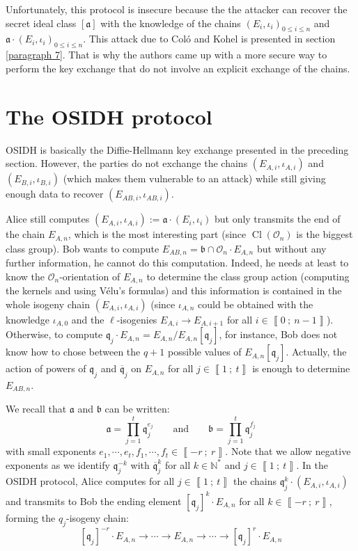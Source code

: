 \documentclass[a4paper,10pt]{report}
\theoremstyle{definition}
\theoremstyle{plain}
\theoremstyle{definition}
\newcommand{\N}{\mathbb{N}}
\newcommand{\mO}{\mathcal{O}}
\renewcommand{\i}[2]{\left\llbracket #1~;~#2\right\rrbracket}
\renewcommand{\(}{\left(}
\renewcommand{\)}{\right)}
\newcommand{\mf}[1]{\mathfrak{#1}}
\newcommand{\mfq}{\mathfrak{q}}
\DeclareMathOperator{\Cl}{Cl}
\begin{document}
Unfortunately, this protocol is insecure because the the attacker can recover the secret ideal class $[\mf{a}]$ with the knowledge of the chains $(E_i,\iota_i)_{0\leq i\leq n}$ and $\mf{a}\cdot(E_i,\iota_i)_{0\leq i\leq n}$.  This attack due to Col\'{o} and Kohel \cite[§ 5.1]{OSIDH} is presented in section \ref{paragraph 7}.  That is why the authors came up with a more secure way to perform the key exchange that do not involve an explicit exchange of the chains.

\section{The OSIDH protocol}\label{paragraph 8}

OSIDH is basically the Diffie-Hellmann key exchange presented in the preceding section. However,  the parties do not exchange the chains $(E_{A,i},\iota_{A,i})$ and $(E_{B,i},\iota_{B,i})$ (which makes them vulnerable to an attack) while still giving enough data to recover $(E_{AB,i},\iota_{AB,i})$.  

Alice still computes $(E_{A,i},\iota_{A,i}):=\mf{a}\cdot (E_i,\iota_i)$ but only transmits the end of the chain $E_{A,n}$, which is the most interesting part (since $\Cl(\mO_n)$ is the biggest class group).  Bob wants to compute $E_{AB,n}=\mf{b}\cap\mO_n\cdot E_{A,n}$ but without any further information, he cannot do this computation. Indeed, he needs at least to know the $\mO_n$-orientation of $E_{A,n}$ to determine the class group action (computing the kernels and using V\'{e}lu's formulas) and this information is contained in the whole isogeny chain $(E_{A,i},\iota_{A,i})$ (since $\iota_{A,n}$ could be obtained with the knowledge $\iota_{A,0}$ and the $\ell$-isogenies $E_{A,i}\longrightarrow E_{A,i+1}$ for all $i\in\i{0}{n-1}$). Otherwise, to compute $\mfq_j\cdot E_{A,n}=E_{A,n}/E_{A,n}[\mfq_j]$, for instance, Bob does not know how to chose between the $q+1$ possible values of $E_{A,n}[\mfq_j]$.  Actually, the action of powers of $\mfq_j$ and $\overline{\mfq}_j$ on $E_{A,n}$ for all $j\in\i{1}{t}$ is enough to determine $E_{AB,n}$.

We recall that $\mf{a}$ and $\mf{b}$ can be written:
\[\mf{a}=\prod_{j=1}^t \mf{q}_j^{e_j} \qquad \mbox{and} \qquad \mf{b}=\prod_{j=1}^t \mf{q}_j^{f_j}\]
with small exponents $e_1,\cdots,e_t, f_1,\cdots,f_t\in\i{-r}{r}$.  Note that we allow negative exponents as we identify $\mf{q}_j^{-k}$ with $\overline{\mf{q}}_j^{k}$ for all $k\in\N^*$ and $j\in\i{1}{t}$.  In the OSIDH protocol, Alice computes for all $j\in\i{1}{t}$ the chains $\mfq_j^k\cdot (E_{A,i},\iota_{A,i})$ and transmits to Bob the ending element $[\mfq_j]^k\cdot E_{A,n}$ for all $k\in\i{-r}{r}$, forming the $q_j$-isogeny chain:
\[[\mfq_j]^{-r}\cdot E_{A,n}\longrightarrow \cdots \longrightarrow E_{A,n}\longrightarrow \cdots\longrightarrow [\mfq_j]^{r}\cdot E_{A,n}\]
\end{document}
